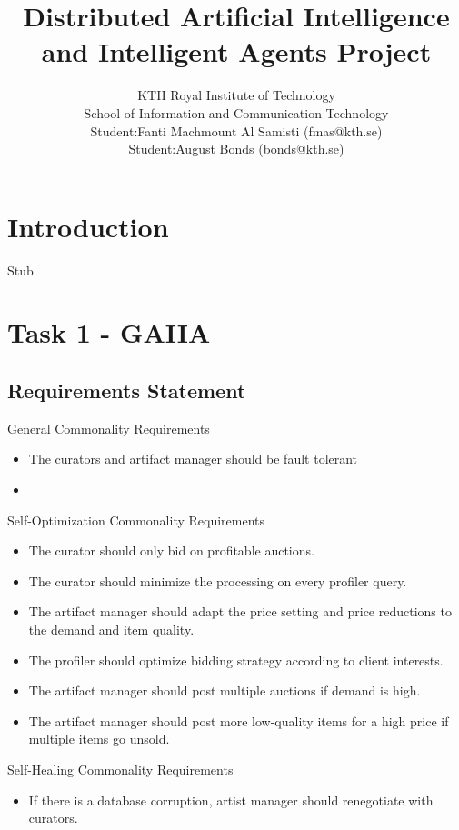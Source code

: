 \documentclass[a4paper, 11pt]{article}
\title{\textbf{Distributed Artificial Intelligence and Intelligent Agents Project}}
\author{KTH Royal Institute of Technology \\ 
		School of Information and Communication Technology \\
		Student:Fanti Machmount Al Samisti (fmas@kth.se) \\
		Student:August Bonds (bonds@kth.se)}
\begin{document}
	
\maketitle

\tableofcontents

\section{Introduction}

Stub

\section{Task 1 - GAIIA}

\subsection{Requirements Statement}

General Commonality Requirements
\begin{itemize}
\item The curators and artifact manager should be fault tolerant
\item 
\end{itemize}

Self-Optimization Commonality Requirements
\begin{itemize}
\item The curator should only bid on profitable auctions.
\item The curator should minimize the processing on every profiler query.
\item The artifact manager should adapt the price setting and price reductions to the demand and item quality.
\item The profiler should optimize bidding strategy according to client interests.
\item The artifact manager should post multiple auctions if demand is high. 
\item The artifact manager should post more low-quality items for a high price if multiple items go unsold. 
\end{itemize}

Self-Healing Commonality Requirements
\begin{itemize}
\item If there is a database corruption, artist manager should renegotiate with curators. 
\end{itemize}
\end{document}
